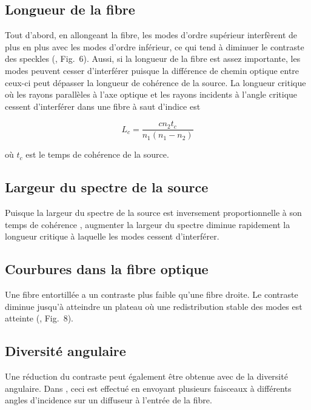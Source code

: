 \documentclass{article}       %
\begin{document}
\subsection{Longueur de la fibre}

Tout d'abord, en allongeant la fibre, les modes d'ordre supérieur interfèrent de plus en plus avec les modes d'ordre inférieur, ce qui tend à diminuer le contraste des speckles (\cite{FiberStats}, Fig.~6). Aussi, si la longueur de la fibre est assez importante, les modes peuvent cesser d'interférer puisque la différence de chemin optique entre ceux-ci peut dépasser la longueur de cohérence de la source. La longueur critique où les rayons parallèles à l'axe optique et les rayons incidents à l'angle critique cessent d'interférer dans une fibre à saut d'indice est \cite{Coherence}

\begin{equation}
    L_{c} = \frac{c n_{2} t_{c}}{n_{1}(n_{1} - n_{2})}
\end{equation}

où $t_c$ est le temps de cohérence de la source.

\subsection{Largeur du spectre de la source}

Puisque la largeur du spectre de la source est inversement proportionnelle à son temps de cohérence \cite{Coherence}, augmenter la largeur du spectre diminue rapidement la longueur critique à laquelle les modes cessent d'interférer.

\subsection{Courbures dans la fibre optique}

Une fibre entortillée a un contraste plus faible qu'une fibre droite. Le contraste diminue jusqu'à atteindre un plateau où une redistribution stable des modes est atteinte (\cite{FiberStats}, Fig.~8).

\subsection{Diversité angulaire}

Une réduction du contraste peut également être obtenue avec de la diversité angulaire. Dans \cite{Angular}, ceci est effectué en envoyant plusieurs faisceaux à différents angles d'incidence sur un diffuseur à l'entrée de la fibre.
\end{document}
